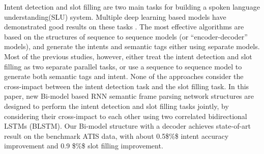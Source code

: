 Intent detection and slot filling are two main tasks for building a spoken language understanding(SLU) system. Multiple deep learning based models have demonstrated good results on these tasks . The most effective algorithms are based on the structures of sequence to sequence models (or ``encoder-decoder'' models), and generate the intents and semantic tags either using separate models. Most of the previous studies, however, either treat the intent detection and slot filling as two separate parallel tasks, or use a sequence to sequence model to generate both semantic tags and intent. None of the approaches consider the cross-impact between the intent detection task and the slot filling task. In this paper, new Bi-model based RNN semantic frame parsing network structures are designed to perform the intent detection and slot filling tasks jointly, by considering their cross-impact to each other using two correlated bidirectional LSTMs (BLSTM). Our Bi-model structure with a decoder achieves state-of-art result on the benchmark ATIS data, with about 0.5\$\%\$ intent accuracy improvement and 0.9 \$\%\$ slot filling improvement.
